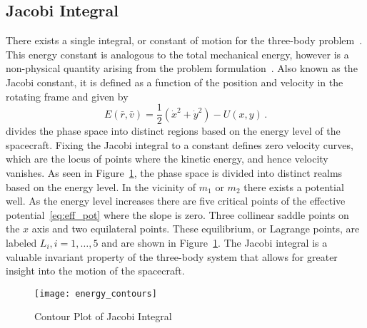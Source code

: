\documentclass[letterpaper, paper,11pt]{AAS}		%
\begin{document}
\subsection{Jacobi Integral}
There exists a single integral, or constant of motion for the three-body problem~\cite{lanczos1970,szebehely1967}.
This energy constant is analogous to the total mechanical energy, however is a non-physical quantity arising from the problem formulation~\cite{szebehely1967}.
Also known as the Jacobi constant, it is defined as a function of the position and velocity in the rotating frame and given by
\begin{equation}
	E\left( \bar{r} , \bar{v} \right) = \frac{1}{2}\left( \dot{x}^2 + \dot{y}^2\right) - U\left(x,y \right) \, .
	\label{eq:jacobi}
\end{equation}
 divides the phase space into distinct regions based on the energy level of the spacecraft.
Fixing the Jacobi integral to a constant defines zero velocity curves, which are the locus of points where the kinetic energy, and hence velocity vanishes.
As seen in Figure~\ref{fig:energy_contour}, the phase space is divided into distinct realms based on the energy level.
In the vicinity of \( m_1\) or \(m_2\) there exists a potential well. 
As the energy level increases there are five critical points of the effective potential~\cref{eq:eff_pot} where the slope is zero.
Three collinear saddle points on the \(x\) axis and two equilateral points.
These equilibrium, or Lagrange points, are labeled \( L_i, i = 1, \hdots, 5 \) and are shown in Figure~\ref{fig:energy_contour}.
The Jacobi integral is a valuable invariant property of the three-body system that allows for greater insight into the motion of the spacecraft.
\begin{figure}[htbp]
	\centering
	\texttt{[image: energy\_contours]}
	\caption{Contour Plot of Jacobi Integral}
	\label{fig:energy_contour}
\end{figure} 
\end{document}
